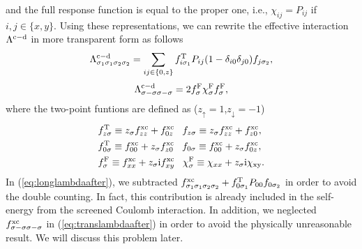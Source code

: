 %
and the full response function is equal to the proper one, i.e., $\chi_{ij} = P_{ij}$ if 
$i, j \in \{x,y\}$.
Using these representations, we can rewrite the effective interaction $\Lambda^{\rm c - \rm d}$ in
more transparent form as follows
%
\begin{equation}
	\Lambda^{\rm c - \rm d}_{\sigma_1\sigma_1\sigma_2\sigma_2} = 
	\sum_{ij \in \{0,z\}} f^{\rm T}_{i\sigma_1}P_{ij}(1-\delta_{i0}\delta_{j0})f_{j\sigma_2},
	\label{eq:longlambdaafter}
\end{equation}
%
\begin{equation}
	\Lambda^{\rm c - \rm d}_{\sigma-\sigma\sigma-\sigma} = 
	2f^{\rm F}_{\sigma}\chi^{\rm F}_{\sigma}f^{\rm F}_{\sigma},
	\label{eq:translambdaafter}
\end{equation}
%
where the two-point funtions are defined as ($z_{\uparrow} = 1$,$z_{\downarrow} = -1$)
%
\begin{equation}
	\begin{split}
	&f^{\rm T}_{z\sigma} \equiv z_{\sigma}f^{\rm xc}_{zz} + f^{\rm xc}_{0z} \;\;\;
	f_{z\sigma} \equiv z_{\sigma}f^{\rm xc}_{zz} + f^{\rm xc}_{z0},\\
	&f^{\rm T}_{0\sigma} \equiv f^{\rm xc}_{00} + z_{\sigma}f^{\rm xc}_{z0} \;\;\;
	f_{0\sigma} \equiv f^{\rm xc}_{00} + z_{\sigma}f^{\rm xc}_{0z}, \\
	&f^{\rm F}_{\sigma} \equiv f^{\rm xc}_{xx} + z_{\sigma}{\rm i}f^{\rm xc}_{xy} \;\;\;
	\chi^{\rm F}_{\sigma} \equiv \chi_{xx} + z_{\sigma}\rm i \chi_{xy}.
	\label{eq:fdefine}
\end{split}
\end{equation}
%
In (\ref{eq:longlambdaafter}), we subtracted $f^{\rm xc}_{\sigma_1\sigma_1\sigma_2\sigma_2}+
f^{\rm T}_{0\sigma_1}P_{00}f_{0\sigma_2}$ in order to avoid the double counting.
In fact, this contribution is already included in the self-energy from the screened Coulomb interaction.
In addition, we neglected $f^{\rm xc}_{\sigma-\sigma\sigma-\sigma}$ in (\ref{eq:translambdaafter})
in order to avoid the physically unreasonable result. We will discuss this problem later.

